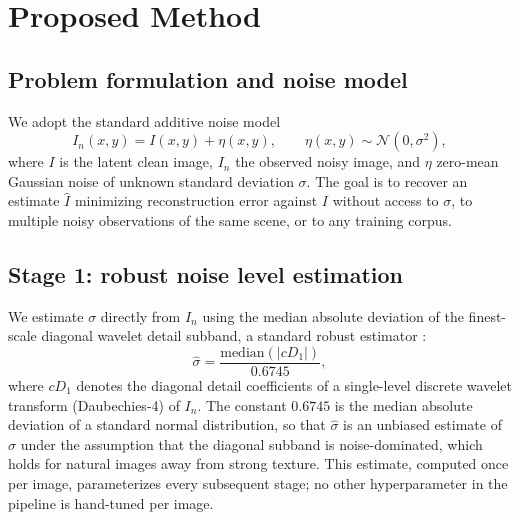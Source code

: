 \documentclass[final,3p,times,twocolumn,nopreprintline]{elsarticle}
\begin{document}
\section{Proposed Method}
\label{sec:method}

\subsection{Problem formulation and noise model}
We adopt the standard additive noise model
\begin{equation}
I_n(x,y) = I(x,y) + \eta(x,y), \qquad \eta(x,y) \sim \mathcal{N}(0,\sigma^2),
\label{eq:noisemodel}
\end{equation}
where $I$ is the latent clean image, $I_n$ the observed noisy image, and $\eta$ zero-mean Gaussian noise of unknown standard deviation $\sigma$. The goal is to recover an estimate $\hat{I}$ minimizing reconstruction error against $I$ without access to $\sigma$, to multiple noisy observations of the same scene, or to any training corpus.

\subsection{Stage 1: robust noise level estimation}
We estimate $\sigma$ directly from $I_n$ using the median absolute deviation of the finest-scale diagonal wavelet detail subband, a standard robust estimator \cite{donoho1995noising}:
\begin{equation}
\hat\sigma = \frac{\mathrm{median}(|cD_1|)}{0.6745},
\label{eq:mad}
\end{equation}
where $cD_1$ denotes the diagonal detail coefficients of a single-level discrete wavelet transform (Daubechies-4) of $I_n$. The constant $0.6745$ is the median absolute deviation of a standard normal distribution, so that $\hat\sigma$ is an unbiased estimate of $\sigma$ under the assumption that the diagonal subband is noise-dominated, which holds for natural images away from strong texture. This estimate, computed once per image, parameterizes every subsequent stage; no other hyperparameter in the pipeline is hand-tuned per image.
\end{document}
